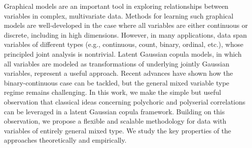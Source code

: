 
\noindent Graphical models are an important tool in exploring relationships between variables in complex, multivariate data. Methods for learning such graphical models are well-developed in the case where all variables are either continuous or discrete, including in high dimensions. However, in many applications, data span variables of different types (e.g., continuous, count, binary, ordinal, etc.), whose principled joint analysis is nontrivial. Latent Gaussian copula models, in which all variables are modeled as transformations of underlying jointly Gaussian variables, represent a useful approach. Recent advances have shown how the binary-continuous case can be tackled, but the general mixed variable type regime remains challenging. In this work, we make the simple but useful observation that classical ideas concerning polychoric and polyserial correlations can be leveraged in a latent Gaussian copula framework. Building on this observation, we propose a flexible and scalable methodology for data with variables of entirely general mixed type. We study the key properties of the approaches theoretically and empirically. %